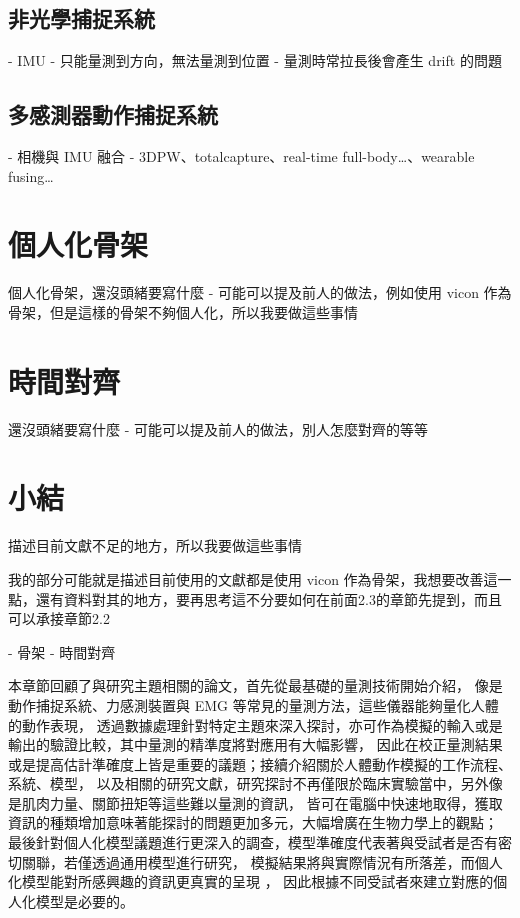 \subsection{非光學捕捉系統}
- IMU
    - 只能量測到方向，無法量測到位置
    - 量測時常拉長後會產生 drift 的問題

\subsection{多感測器動作捕捉系統}
- 相機與 IMU 融合
- 3DPW、totalcapture、real-time full-body…、wearable fusing…

\section{個人化骨架}
個人化骨架，還沒頭緒要寫什麼
- 可能可以提及前人的做法，例如使用 vicon 作為骨架，但是這樣的骨架不夠個人化，所以我要做這些事情

\section{時間對齊}
還沒頭緒要寫什麼
- 可能可以提及前人的做法，別人怎麼對齊的等等

\section{小結}
描述目前文獻不足的地方，所以我要做這些事情

我的部分可能就是描述目前使用的文獻都是使用 vicon 作為骨架，我想要改善這一點，還有資料對其的地方，要再思考這不分要如何在前面2.3的章節先提到，而且可以承接章節2.2

- 骨架
- 時間對齊

本章節回顧了與研究主題相關的論文，首先從最基礎的量測技術開始介紹，
像是動作捕捉系統、力感測裝置與 EMG 等常見的量測方法，這些儀器能夠量化人體的動作表現，
透過數據處理針對特定主題來深入探討，亦可作為模擬的輸入或是輸出的驗證比較，其中量測的精準度將對應用有大幅影響，
因此在校正量測結果或是提高估計準確度上皆是重要的議題；接續介紹關於人體動作模擬的工作流程、系統、模型，
以及相關的研究文獻，研究探討不再僅限於臨床實驗當中，另外像是肌肉力量、關節扭矩等這些難以量測的資訊，
皆可在電腦中快速地取得，獲取資訊的種類增加意味著能探討的問題更加多元，大幅增廣在生物力學上的觀點；
最後針對個人化模型議題進行更深入的調查，模型準確度代表著與受試者是否有密切關聯，若僅透過通用模型進行研究，
模擬結果將與實際情況有所落差，而個人化模型能對所感興趣的資訊更真實的呈現 \cite{akhundov2022subject}，
因此根據不同受試者來建立對應的個人化模型是必要的。

